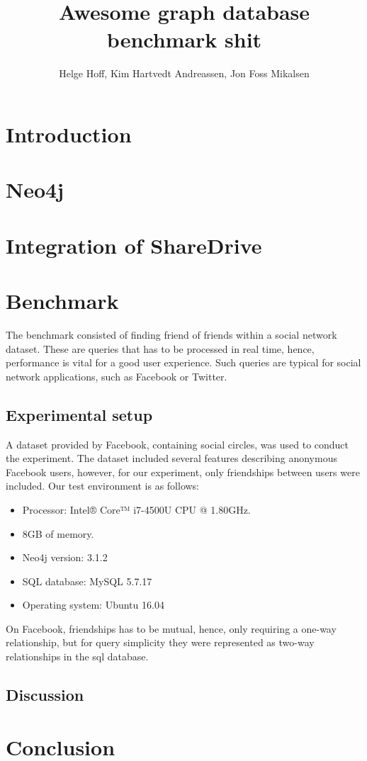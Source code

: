 \documentclass[a4paper, 12pt, conference]{IEEEtran}
\def \thetitle {Awesome graph database benchmark shit}
\def \theauthor {Helge Hoff, Kim Hartvedt Andreassen, Jon Foss Mikalsen}
\begin{document}
\title{\thetitle}
\author{\theauthor}

\maketitle
\thispagestyle{plain}

 
\IEEEpeerreviewmaketitle

\section{Introduction}

\section{Neo4j}
\cite{neo_scale}
\section{Integration of ShareDrive}
\section{Benchmark}
The benchmark consisted of finding friend of friends within a social network dataset.
These are queries that has to be processed in real time, hence, performance is vital for a good user experience.
Such queries are typical for social network applications, such as Facebook or Twitter.
\subsection{Experimental setup}
A dataset provided by Facebook, containing social circles, was used to conduct the experiment.
The dataset included several features describing anonymous Facebook users, however, for our experiment, only friendships between users were included.
Our test environment is as follows: 
\begin{itemize}
	\item Processor: Intel® Core™ i7-4500U CPU @ 1.80GHz.
	\item 8GB of memory. 
	\item Neo4j version: 3.1.2
	\item SQL database: MySQL 5.7.17
	\item Operating system: Ubuntu 16.04
\end{itemize}
On Facebook, friendships has to be mutual, hence, only requiring a one-way relationship, but for query simplicity they were represented as two-way relationships in the sql database.

\subsection{Discussion}


\section{Conclusion}






\end{document}
